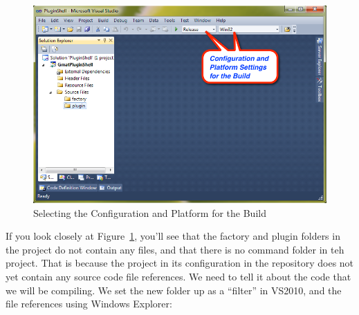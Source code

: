 \documentclass[10pt,letterpaper]{article}
\begin{document}
\begin{figure}[htb]
\begin{center}
\includegraphics[scale=.5]{images/VS2010BuildSettings.png}
\caption{\label{VS2010PlatformSettings}Selecting the Configuration and Platform for the Build}
\end{center}
\end{figure} 

If you look closely at Figure~\ref{VS2010PlatformSettings}, you'll see that the factory and plugin folders in the project do not contain any files, and that there is no command folder in teh project.  That is because the project in its configuration in the repository does not yet contain any source code file references.  We need to tell it about the code that we will be compiling.  We set the new folder up as a ``filter'' in VS2010, and the file references using Windows Explorer:
\end{document}
